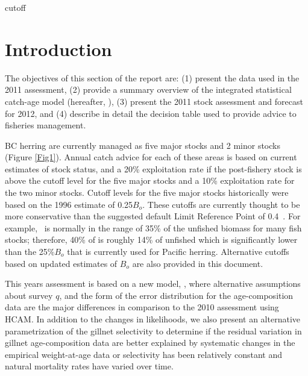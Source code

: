 cutoff%


\section{Introduction}

The objectives of this section of the report are: (1) present the data used in the 2011 assessment, (2) provide a summary overview of the integrated statistical catch-age model (hereafter, \iscam), (3) present the 2011 stock assessment and forecast for 2012, and (4) describe in detail the decision table used to provide advice to fisheries management.

BC herring are currently managed as five major stocks and 2 minor stocks (Figure \ref{Fig1}).  Annual catch advice for each of these areas is based on current estimates of stock status, and a 20\% exploitation rate if the post-fishery stock is above the cutoff level for the five major stocks and a 10\% exploitation rate for the two minor stocks.  Cutoff levels for the five major stocks historically were based on the 1996 estimate of  0.25$B_o$.  These cutoffs are currently thought to be more conservative 	than the suggested default Limit Reference Point of 0.4\bmsy\ \citep{dfo2006}. For example, \bmsy\ is normally in the range of 35\% of the unfished biomass for many fish stocks; therefore,  40\% of \bmsy is roughly 14\% of  unfished which is significantly lower than the 25\%$B_o$ that is currently used for Pacific herring.   Alternative cutoffs based on updated estimates of $B_o$ are also provided in this document.

This years assessment is based on a new model, \iscam, where alternative assumptions about survey $q$, and the form of the error distribution for the age-composition data are the major differences in comparison to the 2010 assessment using HCAM.  In addition to the changes in likelihoods, we also present an alternative parametrization of the gillnet selectivity to determine if the residual variation in gillnet age-composition data are better explained by systematic changes in the empirical weight-at-age data or selectivity has been relatively constant and natural mortality rates have varied over time.


